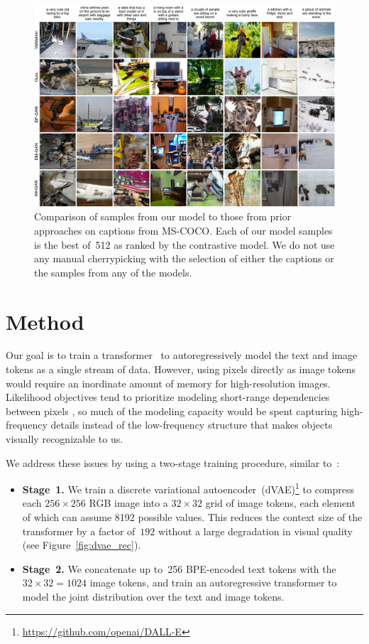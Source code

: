 \documentclass{article}
\begin{document}
\begin{figure}[t]
    \centering
    \includegraphics[width=\linewidth]{coco_cmp_v2.jpg}
    \caption{Comparison of samples from our model to those from prior approaches on captions from MS-COCO. Each of our model samples is the best of~512 as ranked by the contrastive model. We do not use any manual cherrypicking with the selection of either the captions or the samples from any of the models.}
    \label{fig:coco_cmp}
\end{figure}
%
\section{Method}
Our goal is to train a transformer~\cite{vaswani2017attention} to autoregressively model the text and image tokens as a single stream of data. However, using pixels directly as image tokens would require an inordinate amount of memory for high-resolution images. Likelihood objectives tend to prioritize modeling short-range dependencies between pixels \citep{salimans2017pixelcnn++}, so much of the modeling capacity would be spent capturing high-frequency details instead of the low-frequency structure that makes objects visually recognizable to us.

We address these issues by using a two-stage training procedure, similar to~\cite{oord2017neural,razavi2019generating}:
\begin{itemize}
    \item \textbf{Stage~1.} We train a discrete variational autoencoder~(dVAE)\footnote{\url{https://github.com/openai/DALL-E}} to compress each $256 \times 256$ RGB image into a $32 \times 32$ grid of image tokens, each element of which can assume \num{8192} possible values. This reduces the context size of the transformer by a factor of~$192$ without a large degradation in visual quality (see Figure~\ref{fig:dvae_rec}).
    \item \textbf{Stage~2.} We concatenate up to~256 BPE-encoded text tokens with the~$32 \times 32 = 1024$ image tokens, and train an autoregressive transformer to model the joint distribution over the text and image tokens.
\end{itemize}
\end{document}
